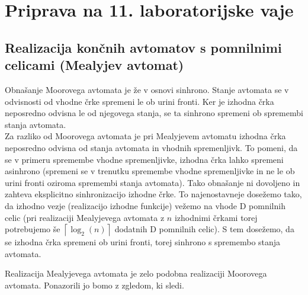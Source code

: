 \chapter{Priprava na 11. laboratorijske vaje}
\section{Realizacija končnih avtomatov s pomnilnimi celicami (Mealyjev avtomat)}

Obnašanje Moorovega avtomata je že v osnovi sinhrono. Stanje avtomata se v odvisnosti od vhodne črke spremeni le ob urini fronti. Ker je izhodna črka neposredno odvisna le od njegovega stanja, se ta sinhrono spremeni ob spremembi stanja avtomata.\\


Za razliko od Moorovega avtomata je pri Mealyjevem avtomatu izhodna črka neposredno odvisna od stanja avtomata in vhodnih spremenljivk. To pomeni, da se v primeru spremembe vhodne spremenljivke, izhodna črka lahko spremeni asinhrono (spremeni se v trenutku spremembe vhodne spremenljivke in ne le ob urini fronti oziroma spremembi stanja avtomata). Tako obnašanje ni dovoljeno in zahteva eksplicitno sinhronizacijo izhodne črke. To najenostavneje dosežemo tako, da izhodno vezje (realizacijo izhodne funkcije) vežemo na vhode D pomnilnih celic (pri realizaciji Mealyjevega avtomata z $n$ izhodnimi črkami torej potrebujemo še $\left\lceil \log_2(n)\right\rceil$ dodatnih D pomnilnih celic). S tem dosežemo, da se izhodna črka spremeni ob urini fronti, torej sinhrono s spremembo stanja avtomata.

Realizacija Mealyjevega avtomata je zelo podobna realizaciji Moorovega avtomata. Ponazorili jo bomo z zgledom, ki sledi.

